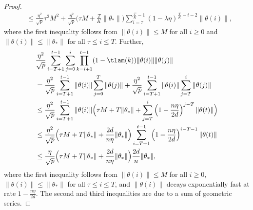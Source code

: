 \begin{proof}
\begin{align*}
        & \leq \frac{\eta^2}{\sqrt p} \tau^2 M^2 + \frac{\eta^2}{\sqrt p} \Big( \tau M + \frac{T}{K} \|\theta_*\| \Big) \sum_{i=\tau}^{\frac{T}{K}-1}(1 - \lambda\eta)^{\frac{T}{K}-i-2} \|\theta(i)\|,
    \end{align*}
    where the first inequality follows from $\|\theta(i)\|\leq M$ for all $i\geq 0$ and $\|\theta(i)\|\leq \|\theta_*\|$ for all $\tau\leq i\leq T$. Further, 
    \begin{align*}
        & \frac{\eta^2}{\sqrt p}\sum_{i=T+1}^{t-1}\sum_{j=0}^i\prod_{k=i+1}^{t-1}(1-\tlam(k)) \|\theta(i)\|\|\theta(j)\| \\
        & = \frac{\eta^2}{\sqrt p}\sum_{i=T+1}^{t-1} \|\theta(i)\| \sum_{j=0}^T \|\theta(j)\| + \frac{\eta^2}{\sqrt p}\sum_{i=T+1}^{t-1} \|\theta(i)\| \sum_{j=T}^i\|\theta(j)\| \\
        & \leq \frac{\eta^2}{\sqrt p}\sum_{i=T+1}^{t-1} \|\theta(i)\| \Big( \tau M + T\|\theta_*\| + \sum_{j=T}^i \left( 1-\frac{n\eta}{2d} \right)^{j-T} \|\theta(t)\| \Big) \\
        & \leq \frac{\eta^2}{\sqrt p} \Big( \tau M + T\|\theta_*\| + \frac{2d}{n\eta} \|\theta_*\| \Big) \sum_{i=T+1}^{t-1} \left( 1-\frac{n\eta}{2d} \right)^{i-T-1} \|\theta(t)\| \\
        & \leq \frac{\eta}{\sqrt p} \Big( \tau M + T\|\theta_*\| + \frac{2d}{n\eta} \|\theta_*\| \Big) \frac{2d}{n} \|\theta_*\|,
    \end{align*}
    where the first inequality follows from $\|\theta(i)\|\leq M$ for all $i\geq 0$, $\|\theta(i)\|\leq \|\theta_*\|$ for all $\tau\leq i\leq T$, and $\|\theta(i)\|$ decays exponentially fast at rate $1-\frac{n\eta}{2d}$. The second and third inequalities are due to a sum of geometric series.
    

\end{proof}
